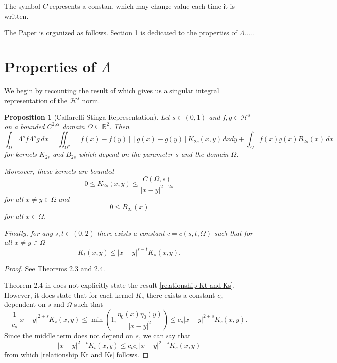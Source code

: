\documentclass[11pt]{amsart}
\newtheorem{proposition}[theorem]{Proposition}
\theoremstyle{remark}
\theoremstyle{definition}
\newcommand{\R}{\mathbb{R}}
\newcommand{\paren}[1]{\left( #1 \right)}
\newcommand{\eigen}[1]{\eta_{#1}} %
\newcommand{\HD}{\mathcal{H}}
\begin{document}
The symbol $C$ represents a constant which may change value each time it is written.  
\vskip0.3cm

The Paper is organized as follows. Section \ref{sec:lemmas} is dedicated to the properties of $\Lambda$.....



\section{Properties of $\Lambda$} \label{sec:lemmas}

We begin by recounting the result of \cite{CaSt} which gives us a singular integral representation of the $\HD^s$ norm.  
\begin{proposition}[Caffarelli-Stinga Representation] \label{thm:Caff Stinga representation}
Let $s \in (0,1)$ and $f,g \in \HD^{s}$ on a bounded $C^{2,\alpha}$ domain $\Omega \subseteq \R^2$.  Then
\[ \int_\Omega \Lambda^s f \Lambda^s g \,dx = \iint_{\Omega^2} [f(x)-f(y)][g(x)-g(y)] K_{2s}(x,y) \,dxdy + \int_{\Omega} f(x) g(x) B_{2s}(x) \,dx \]
for kernels $K_{2s}$ and $B_{2s}$ which depend on the parameter $s$ and the domain $\Omega$.  

Moreover, these kernels are bounded
\[ 0 \leq K_{2s}(x,y) \leq \frac{C(\Omega,s)}{|x-y|^{2+2s}} \]
for all $x \neq y \in \Omega$ and
\[ 0 \leq B_{2s}(x) \]
for all $x \in \Omega$.  

Finally, for any $s,t \in (0,2)$ there exists a constant $c = c(s,t,\Omega)$ such that for all $x\neq y \in \Omega$
\begin{equation} \label{relationship Kt and Ks} K_{t}(x,y) \leq |x-y|^{s-t} K_{s}(x,y). \end{equation}
\end{proposition}

\begin{proof}
See \cite{CaSt} Theorems 2.3 and 2.4.  

Theorem 2.4 in \cite{CaSt} does not explicitly state the result \eqref{relationship Kt and Ks}.  However, it does state that for each kernel $K_s$ there exists a constant $c_s$ dependent on $s$ and $\Omega$ such that 
\[ \frac{1}{c_s} |x-y|^{2+s} K_s(x,y) \leq \min\paren{1,\frac{\eigen{0}(x)\eigen{0}(y)}{|x-y|^2}} \leq c_s |x-y|^{2+s} K_s(x,y). \]
Since the middle term does not depend on $s$, we can say that
\[ |x-y|^{2+t} K_t(x,y) \leq c_t c_s |x-y|^{2+s} K_s(x,y) \]
from which \eqref{relationship Kt and Ks} follows.  
\end{proof}
\end{document}
